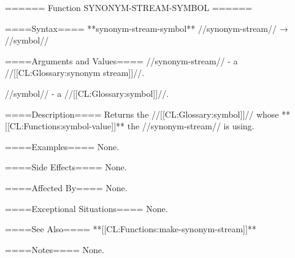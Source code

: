 ====== Function SYNONYM-STREAM-SYMBOL ======

====Syntax====
**synonym-stream-symbol** //synonym-stream// → //symbol//

====Arguments and Values====
//synonym-stream// - a //[[CL:Glossary:synonym stream]]//.

//symbol// - a //[[CL:Glossary:symbol]]//.

====Description====
Returns the //[[CL:Glossary:symbol]]// whose **[[CL:Functions:symbol-value]]** the //synonym-stream// is using.

====Examples====
None.

====Side Effects====
None.

====Affected By====
None.

====Exceptional Situations====
None.

====See Also====
**[[CL:Functions:make-synonym-stream]]**

====Notes====
None.

